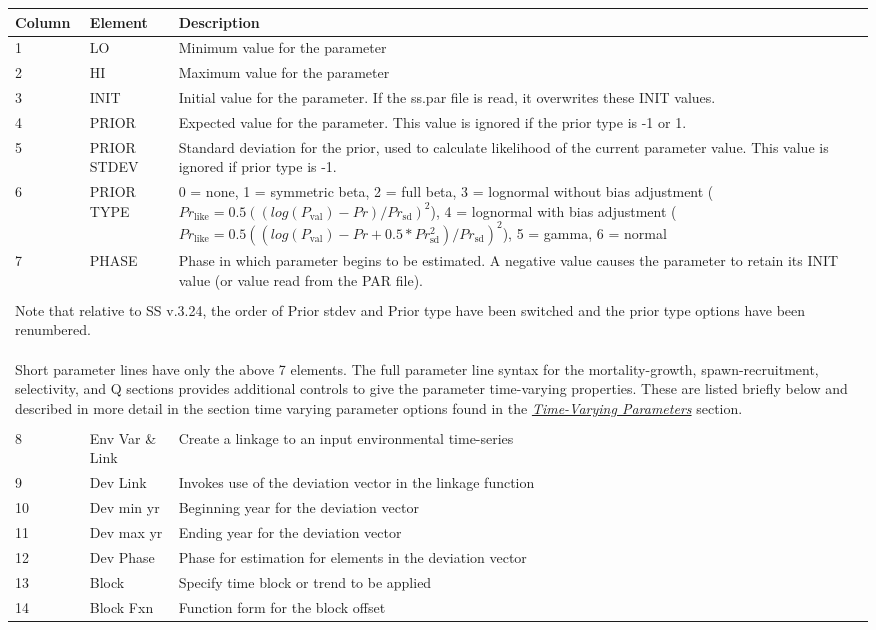 \hypertarget{Prior}{} \hypertarget{paraOrder}{}
\begin{center}
	\begin{tabular}{p{2cm} p{3cm} p{10cm}}
		Column & Element & Description\\
		\hline
		1 & LO & Minimum value for the parameter\\
		2 & HI & Maximum value for the parameter\\
		3 & INIT & Initial value for the parameter.  If the ss.par file is read, it overwrites these INIT values.\\
		4 & PRIOR & Expected value for the parameter.  This value is ignored if the prior type is -1 or 1.\\
		5 & PRIOR STDEV & Standard deviation for the prior, used to calculate likelihood of the current parameter value. This value is ignored if prior type is -1. \\
		6 & PRIOR TYPE  & 0 = none, 1 = symmetric beta, 2 = full beta, 3 = lognormal without bias adjustment ($Pr_{\text{like}} = 0.5((log(P_{\text{val}}) -Pr)/Pr_{\text{sd}})^2$), 4 = lognormal with bias adjustment ($Pr_{\text{like}} = 0.5((log(P_{\text{val}}) -Pr+0.5*Pr_{\text{sd}}^2)/Pr_{\text{sd}})^2$), 5 = gamma, 6 = normal \\
		7 & PHASE & Phase in which parameter begins to be estimated.  A negative value causes the parameter to retain its INIT value (or value read from the PAR file).\\
		 & & \\
		\multicolumn{3}{l}{\parbox{16cm}{Note that relative to SS v.3.24,  the order of Prior stdev and Prior type have been switched and the prior type options have been renumbered.
		\\\\
		Short parameter lines have only the above 7 elements.  The full parameter line syntax for the mortality-growth, spawn-recruitment, selectivity, and Q sections provides additional controls to give the parameter time-varying properties.  These are listed briefly below and described in more detail in the section time varying parameter options found in the \hyperlink{TVpara}{\textit{Time-Varying Parameters}} section.
		}}\\
		 & & \\
		8  & Env Var \& Link & Create a linkage to an input environmental time-series\\
		9  & Dev Link & Invokes use of the deviation vector in the linkage function \\
		10 & Dev min yr & Beginning year for the deviation vector \\
		11 & Dev max yr & Ending year for the deviation vector\\
		12 & Dev Phase & Phase for estimation for elements in the deviation vector \\
		13 & Block & Specify time block or trend to be applied \\
		14 & Block Fxn & Function form for the block offset\\
		\hline
	\end{tabular}
\end{center}

